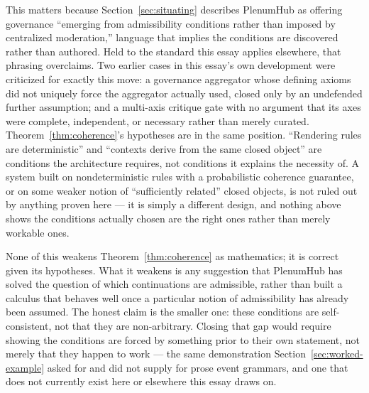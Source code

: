 \documentclass[11pt]{article}
\theoremstyle{definition}
\begin{document}
This matters because Section~\ref{sec:situating} describes PlenumHub as offering governance ``emerging from admissibility conditions rather than imposed by centralized moderation,'' language that implies the conditions are discovered rather than authored. Held to the standard this essay applies elsewhere, that phrasing overclaims. Two earlier cases in this essay's own development were criticized for exactly this move: a governance aggregator whose defining axioms did not uniquely force the aggregator actually used, closed only by an undefended further assumption; and a multi-axis critique gate with no argument that its axes were complete, independent, or necessary rather than merely curated. Theorem~\ref{thm:coherence}'s hypotheses are in the same position. ``Rendering rules are deterministic'' and ``contexts derive from the same closed object'' are conditions the architecture requires, not conditions it explains the necessity of. A system built on nondeterministic rules with a probabilistic coherence guarantee, or on some weaker notion of ``sufficiently related'' closed objects, is not ruled out by anything proven here --- it is simply a different design, and nothing above shows the conditions actually chosen are the right ones rather than merely workable ones.

None of this weakens Theorem~\ref{thm:coherence} as mathematics; it is correct given its hypotheses. What it weakens is any suggestion that PlenumHub has solved the question of which continuations are admissible, rather than built a calculus that behaves well once a particular notion of admissibility has already been assumed. The honest claim is the smaller one: these conditions are self-consistent, not that they are non-arbitrary. Closing that gap would require showing the conditions are forced by something prior to their own statement, not merely that they happen to work --- the same demonstration Section~\ref{sec:worked-example} asked for and did not supply for prose event grammars, and one that does not currently exist here or elsewhere this essay draws on.
\end{document}
